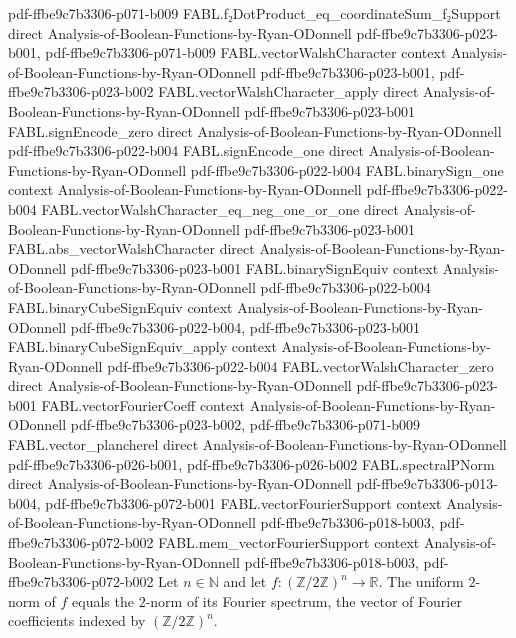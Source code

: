 \begin{theorem}
{    pdf-ffbe9c7b3306-p071-b009}
\proofstep
  {FABL.f₂DotProduct_eq_coordinateSum_f₂Support}
  {direct}
  {Analysis-of-Boolean-Functions-by-Ryan-ODonnell}
  {pdf-ffbe9c7b3306-p023-b001,
    pdf-ffbe9c7b3306-p071-b009}
\proofstep
  {FABL.vectorWalshCharacter}
  {context}
  {Analysis-of-Boolean-Functions-by-Ryan-ODonnell}
  {pdf-ffbe9c7b3306-p023-b001,
    pdf-ffbe9c7b3306-p023-b002}
\proofstep
  {FABL.vectorWalshCharacter_apply}
  {direct}
  {Analysis-of-Boolean-Functions-by-Ryan-ODonnell}
  {pdf-ffbe9c7b3306-p023-b001}
\proofstep
  {FABL.signEncode_zero}
  {direct}
  {Analysis-of-Boolean-Functions-by-Ryan-ODonnell}
  {pdf-ffbe9c7b3306-p022-b004}
\proofstep
  {FABL.signEncode_one}
  {direct}
  {Analysis-of-Boolean-Functions-by-Ryan-ODonnell}
  {pdf-ffbe9c7b3306-p022-b004}
\proofstep
  {FABL.binarySign_one}
  {context}
  {Analysis-of-Boolean-Functions-by-Ryan-ODonnell}
  {pdf-ffbe9c7b3306-p022-b004}
\proofstep
  {FABL.vectorWalshCharacter_eq_neg_one_or_one}
  {direct}
  {Analysis-of-Boolean-Functions-by-Ryan-ODonnell}
  {pdf-ffbe9c7b3306-p023-b001}
\proofstep
  {FABL.abs_vectorWalshCharacter}
  {direct}
  {Analysis-of-Boolean-Functions-by-Ryan-ODonnell}
  {pdf-ffbe9c7b3306-p023-b001}
\proofstep
  {FABL.binarySignEquiv}
  {context}
  {Analysis-of-Boolean-Functions-by-Ryan-ODonnell}
  {pdf-ffbe9c7b3306-p022-b004}
\proofstep
  {FABL.binaryCubeSignEquiv}
  {context}
  {Analysis-of-Boolean-Functions-by-Ryan-ODonnell}
  {pdf-ffbe9c7b3306-p022-b004,
    pdf-ffbe9c7b3306-p023-b001}
\proofstep
  {FABL.binaryCubeSignEquiv_apply}
  {context}
  {Analysis-of-Boolean-Functions-by-Ryan-ODonnell}
  {pdf-ffbe9c7b3306-p022-b004}
\proofstep
  {FABL.vectorWalshCharacter_zero}
  {direct}
  {Analysis-of-Boolean-Functions-by-Ryan-ODonnell}
  {pdf-ffbe9c7b3306-p023-b001}
\proofstep
  {FABL.vectorFourierCoeff}
  {context}
  {Analysis-of-Boolean-Functions-by-Ryan-ODonnell}
  {pdf-ffbe9c7b3306-p023-b002,
    pdf-ffbe9c7b3306-p071-b009}
\proofstep
  {FABL.vector_plancherel}
  {direct}
  {Analysis-of-Boolean-Functions-by-Ryan-ODonnell}
  {pdf-ffbe9c7b3306-p026-b001,
    pdf-ffbe9c7b3306-p026-b002}
\proofstep
  {FABL.spectralPNorm}
  {direct}
  {Analysis-of-Boolean-Functions-by-Ryan-ODonnell}
  {pdf-ffbe9c7b3306-p013-b004,
    pdf-ffbe9c7b3306-p072-b001}
\proofstep
  {FABL.vectorFourierSupport}
  {context}
  {Analysis-of-Boolean-Functions-by-Ryan-ODonnell}
  {pdf-ffbe9c7b3306-p018-b003,
    pdf-ffbe9c7b3306-p072-b002}
\proofstep
  {FABL.mem_vectorFourierSupport}
  {context}
  {Analysis-of-Boolean-Functions-by-Ryan-ODonnell}
  {pdf-ffbe9c7b3306-p018-b003,
    pdf-ffbe9c7b3306-p072-b002}
Let $n\in\mathbb{N}$ and let $f:(\mathbb{Z}/2\mathbb{Z})^n\to\mathbb{R}$. The uniform
$2$-norm of $f$ equals the $2$-norm of its Fourier spectrum, the vector of Fourier
coefficients indexed by $(\mathbb{Z}/2\mathbb{Z})^n$.
\end{theorem}

